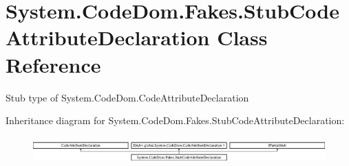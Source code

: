 \hypertarget{class_system_1_1_code_dom_1_1_fakes_1_1_stub_code_attribute_declaration}{\section{System.\-Code\-Dom.\-Fakes.\-Stub\-Code\-Attribute\-Declaration Class Reference}
\label{class_system_1_1_code_dom_1_1_fakes_1_1_stub_code_attribute_declaration}
}


Stub type of System.\-Code\-Dom.\-Code\-Attribute\-Declaration 


Inheritance diagram for System.\-Code\-Dom.\-Fakes.\-Stub\-Code\-Attribute\-Declaration\-:\begin{figure}[H]
\begin{center}
\leavevmode
\includegraphics[height=1.051643cm]{class_system_1_1_code_dom_1_1_fakes_1_1_stub_code_attribute_declaration}
\end{center}
\end{figure}

